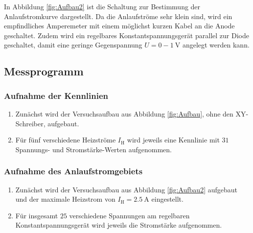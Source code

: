 \FloatBarrier

In Abbildung \ref{fig:Aufbau2} ist die Schaltung zur Bestimmung der
Anlaufstromkurve dargestellt. Da die Anlaufströme sehr klein sind, wird ein
empfindliches Amperemeter mit einem möglichst kurzen Kabel an die Anode
geschaltet. Zudem wird ein regelbares Konstantspannungsgerät parallel
zur Diode geschaltet, damit eine geringe Gegenspannung $U = 0-\SI{1}{\volt}$
angelegt werden kann.

\subsection{Messprogramm}

\subsubsection{Aufnahme der Kennlinien}

\begin{enumerate}

\item Zunächst wird der Versuchsaufbau aus Abbildung \ref{fig:Aufbau}, ohne den
XY-Schreiber, aufgebaut.

\item Für fünf verschiedene Heizströme $I_\text{H}$ wird jeweils eine
Kennlinie mit $31$ Spannungs- und Stromstärke-Werten aufgenommen.

\end{enumerate}

\subsubsection{Aufnahme des Anlaufstromgebiets}

\begin{enumerate}

\item Zunächst wird der Versuchsaufbau aus Abbildung \ref{fig:Aufbau2} aufgebaut
und der maximale Heizstrom von $I_\text{H} = \SI{2.5}{\ampere}$ eingestellt.

\item Für insgesamt $25$ verschiedene Spannungen am regelbaren
Konstantspannungsgerät wird jeweils die Stromstärke aufgenommen.

\end{enumerate}
